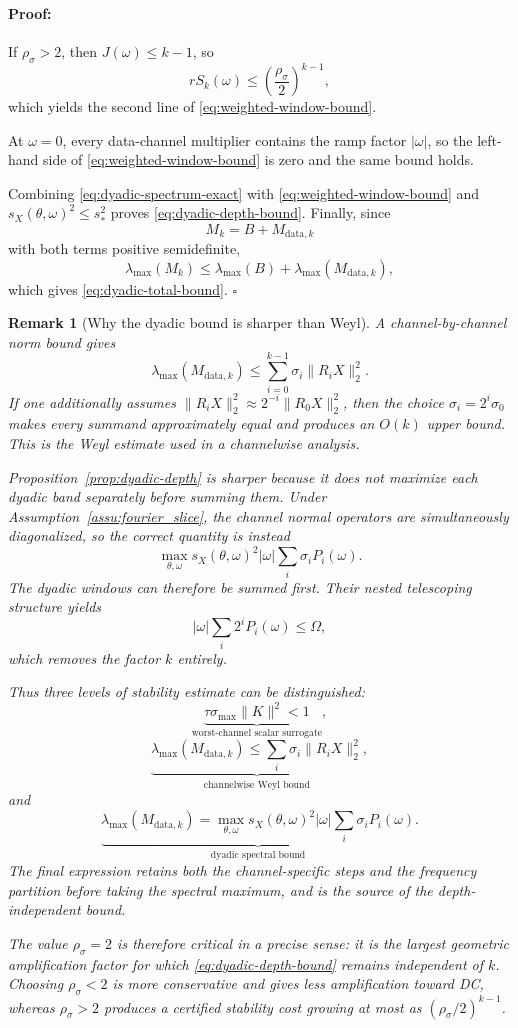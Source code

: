 \documentclass{article}
\newenvironment{proof}{\paragraph{Proof:}}{\hfill$\square$}
\newtheorem{remark}[theorem]{Remark}
\begin{document}
\begin{proof}
If $\rho_\sigma>2$, then
$J(\omega)\le k-1$, so
\[
rS_k(\omega)
\le
\left(\frac{\rho_\sigma}{2}\right)^{k-1},
\]
which yields the second line of
\eqref{eq:weighted-window-bound}.

At $\omega=0$, every data-channel multiplier contains the ramp
factor $|\omega|$, so the left-hand side of
\eqref{eq:weighted-window-bound} is zero and the same bound holds.

Combining \eqref{eq:dyadic-spectrum-exact} with
\eqref{eq:weighted-window-bound} and
$s_X(\theta,\omega)^2\le s_*^2$ proves
\eqref{eq:dyadic-depth-bound}.  Finally, since
\[
M_k=B+M_{\mathrm{data},k}
\]
with both terms positive semidefinite,
\[
\lambda_{\max}(M_k)
\le
\lambda_{\max}(B)
+
\lambda_{\max}(M_{\mathrm{data},k}),
\]
which gives \eqref{eq:dyadic-total-bound}.
\end{proof}



\begin{remark}[Why the dyadic bound is sharper than Weyl]
\label{rmk:dyadic-tight}
A channel-by-channel norm bound gives
\[
\lambda_{\max}(M_{\mathrm{data},k})
\le
\sum_{i=0}^{k-1}
\sigma_i\|R_iX\|_2^2.
\]
If one additionally assumes
$\|R_iX\|_2^2\approx2^{-i}\|R_0X\|_2^2$, then the choice
$\sigma_i=2^i\sigma_0$ makes every summand approximately equal and
produces an $O(k)$ upper bound.  This is the Weyl estimate used in
a channelwise analysis.

Proposition~\ref{prop:dyadic-depth} is sharper because it does not
maximize each dyadic band separately before summing them.  Under
Assumption~\ref{assu:fourier_slice}, the channel normal operators
are simultaneously diagonalized, so the correct quantity is
instead
\[
\max_{\theta,\omega}
s_X(\theta,\omega)^2|\omega|
\sum_i\sigma_iP_i(\omega).
\]
The dyadic windows can therefore be summed first.  Their nested
telescoping structure yields
\[
|\omega|
\sum_i2^iP_i(\omega)
\le\Omega,
\]
which removes the factor $k$ entirely.

Thus three levels of stability estimate can be distinguished:
\[
\underbrace{
\tau\sigma_{\max}\|K\|^2<1
}_{\text{worst-channel scalar surrogate}},
\]
\[
\underbrace{
\lambda_{\max}(M_{\mathrm{data},k})
\le
\sum_i\sigma_i\|R_iX\|_2^2
}_{\text{channelwise Weyl bound}},
\]
and
\[
\underbrace{
\lambda_{\max}(M_{\mathrm{data},k})
=
\max_{\theta,\omega}
s_X(\theta,\omega)^2|\omega|
\sum_i\sigma_iP_i(\omega)
}_{\text{dyadic spectral bound}}.
\]
The final expression retains both the channel-specific steps and the
frequency partition before taking the spectral maximum, and is the
source of the depth-independent bound.

The value $\rho_\sigma=2$ is therefore critical in a precise sense:
it is the largest geometric amplification factor for which
\eqref{eq:dyadic-depth-bound} remains independent of $k$.  Choosing
$\rho_\sigma<2$ is more conservative and gives less amplification
toward DC, whereas $\rho_\sigma>2$ produces a certified stability
cost growing at most as
$(\rho_\sigma/2)^{k-1}$.
\end{remark}
\end{document}
